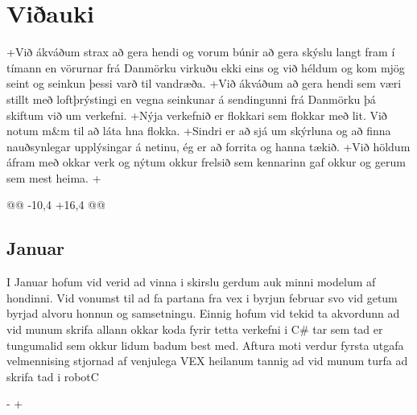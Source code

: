 \section{Viðauki}
+Við ákváðum strax að gera hendi og vorum búnir að gera skýslu langt fram í tímann en vörurnar frá Danmörku virkuðu ekki eins og við héldum og kom mjög seint og seinkun þessi varð til vandræða.
+Við ákváðum að gera hendi sem væri stillt með loftþrýstingi en vegna seinkunar á sendingunni frá Danmörku þá skiftum við um verkefni.
+Nýja verkefnið er flokkari sem flokkar með lit. Við notum m&m til að láta hna flokka.
+Sindri er að sjá um skýrluna og að finna nauðsynlegar upplýsingar á netinu, ég er að forrita og hanna tækið.
+Við höldum áfram með okkar verk og nýtum okkur frelsið sem kennarinn gaf okkur og gerum sem mest heima.
+
 \begingroup
 \obeylines
 
 @@ -10,4 +16,4 @@ \subsection{Januar}
 I Januar hofum vid verid ad vinna i skirslu gerdum auk minni modelum af hondinni. Vid vonumst til ad fa partana fra vex i byrjun februar svo vid getum byrjad alvoru honnun og samsetningu. Einnig hofum vid tekid ta akvordunn ad vid munum skrifa allann okkar koda fyrir tetta verkefni i C# tar sem tad er tungumalid sem okkur lidum badum best med. Aftura moti verdur fyrsta utgafa velmennising stjornad af venjulega VEX heilanum tannig ad vid munum turfa ad skrifa tad i robotC
 \begingroup
 
-\endgroup
+\endgroup